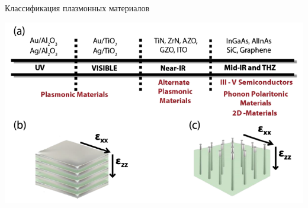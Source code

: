 \documentclass[9pt, compress, xcolor=table]{beamer}
\begin{document}
\begin{frame}{Классификация плазмонных материалов}
\begin{center}
\includegraphics[width=\textwidth]{neg_ref_n6}
\end{center}
\end{frame}
\end{document}
